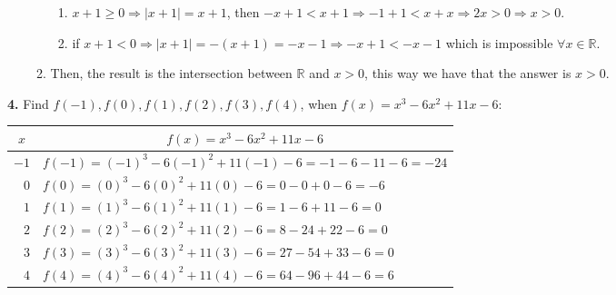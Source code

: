 \documentclass{amsart}
\begin{document}
\begin{enumerate}
\begin{enumerate}
        \begin{enumerate}
            \item $x+1\geq0\Rightarrow |x+1|=x+1$, then $-x+1<x+1\Rightarrow-1+1<x+x\Rightarrow 2x>0\Rightarrow x>0$.
            \item if $x+1<0\Rightarrow|x+1|=-(x+1)=-x-1\Rightarrow-x+1<-x-1$ which is impossible $\forall x \in \mathbb{R}$.
        \end{enumerate}
        \item Then, the result is the intersection between $\mathbb{R}$ and $x>0$, this way we have that the answer is $x>0$.
    \end{enumerate}
\end{enumerate}

\textbf{4.} Find $f(-1), f(0), f(1), f(2), f(3), f(4)$, when $f(x)=x^3-6x^2+11x-6$:\\
\begin{table}[H]
\begin{tabular}{|r|l|}
\hline
\multicolumn{1}{|c|}{\textbf{$x$}} & \multicolumn{1}{|c|}{\textbf{$f(x)=x^3-6x^2+11x-6$}} \\ \hline
$-1$                              & $f(-1)=(-1)^3-6(-1)^2+11(-1)-6=-1-6-11-6=-24$         \\ \hline
$0$                               & $f(0)=(0)^3-6(0)^2+11(0)-6=0-0+0-6=-6$                \\ \hline
$1$                               & $f(1)=(1)^3-6(1)^2+11(1)-6=1-6+11-6=0$               \\ \hline
$2$                               & $f(2)=(2)^3-6(2)^2+11(2)-6=8-24+22-6=0$               \\ \hline
$3$                               & $f(3)=(3)^3-6(3)^2+11(3)-6=27-54+33-6=0$             \\ \hline
$4$                               & $f(4)=(4)^3-6(4)^2+11(4)-6=64-96+44-6=6$              \\ \hline
\end{tabular}
\end{table}
\end{document}
